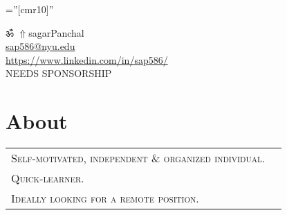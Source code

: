 \documentclass[a4paper]{article}
\newcommand{\apple}{\char"F8FF}
\begin{document}
\pagestyle{empty} 						%
\font\fb=''[cmr10]'' 						%

\par	{\centering
	ॐ
	\href{https://sap586.github.io/LivingSpace/}{$ \Uparrow$}{sagarPanchal}								\\
	\small \href{mailto:sap586@nyu.edu}{sap586@nyu.edu}			
																				\\
	\small \href{https://www.linkedin.com/in/sap586/}{https://www.linkedin.com/in/sap586/}				\\
	\small NEEDS SPONSORSHIP																			\par}
	
\section	{	About		}

	\begin{tabular}{lr}
		\textsc{	Self-motivated, independent \& organized individual.	}\\
		\textsc{	Quick-learner.		}\\
		\textsc{	Ideally looking for a remote position.					}
	\end{tabular}
	\begin{spacing}{0.4}
	\end{spacing}

	
%
\end{document}
